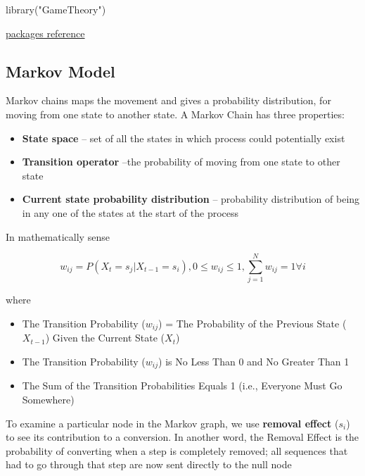 \documentclass[
]{book}
\newenvironment{Shaded}{\begin{snugshade}}{\end{snugshade}}
\newcommand{\FunctionTok}[1]{\textcolor[rgb]{0.00,0.00,0.00}{#1}}
\newcommand{\NormalTok}[1]{#1}
\newcommand{\StringTok}[1]{\textcolor[rgb]{0.31,0.60,0.02}{#1}}
\providecommand{\tightlist}{%
  \setlength{\itemsep}{0pt}\setlength{\parskip}{0pt}}
\begin{document}
\begin{Shaded}
\begin{Highlighting}[]
\FunctionTok{library}\NormalTok{(}\StringTok{"GameTheory"}\NormalTok{)}
\end{Highlighting}
\end{Shaded}

\href{https://cran.r-project.org/web/packages/GameTheory/vignettes/GameTheory.pdf}{packages reference}

\hypertarget{markov-model}{%
\subsection{Markov Model}\label{markov-model}}

Markov chains maps the movement and gives a probability distribution, for moving from one state to another state. A
Markov Chain has three properties:

\begin{itemize}
\tightlist
\item
  \textbf{State space} -- set of all the states in which process could potentially exist
\item
  \textbf{Transition operator} --the probability of moving from one state to other state
\item
  \textbf{Current state probability distribution} -- probability distribution of being in any one of the states at the
  start of the process
\end{itemize}

In mathematically sense

\[
w_{ij}= P(X_t = s_j|X_{t-1}=s_i),0 \le w_{ij} \le 1, \sum_{j=1}^N w_{ij} =1 \forall i
\]

where

\begin{itemize}
\tightlist
\item
  The Transition Probability (\(w_{ij}\)) = The Probability of the Previous State ( \(X_{t-1}\)) Given the Current State
  (\(X_t\))
\item
  The Transition Probability (\(w_{ij}\)) is No Less Than 0 and No Greater Than 1
\item
  The Sum of the Transition Probabilities Equals 1 (i.e., Everyone Must Go Somewhere)
\end{itemize}

To examine a particular node in the Markov graph, we use \textbf{removal effect} (\(s_i\)) to see its contribution to a
conversion. In another word, the Removal Effect is the probability of converting when a step is completely removed; all
sequences that had to go through that step are now sent directly to the null node
\end{document}

